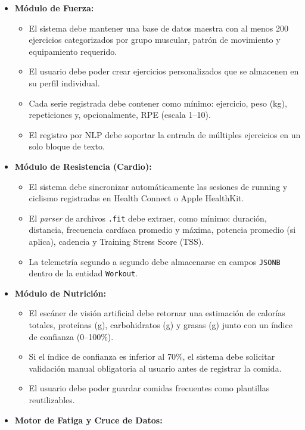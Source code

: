 \documentclass[12pt]{article}
\begin{document}
\begin{itemize}
    \item \textbf{Módulo de Fuerza:}
    \begin{itemize}
        \item El sistema debe mantener una base de datos maestra con al menos 200 ejercicios categorizados por grupo muscular, patrón de movimiento y equipamiento requerido.
        \item El usuario debe poder crear ejercicios personalizados que se almacenen en su perfil individual.
        \item Cada serie registrada debe contener como mínimo: ejercicio, peso (kg), repeticiones y, opcionalmente, RPE (escala 1--10).
        \item El registro por NLP debe soportar la entrada de múltiples ejercicios en un solo bloque de texto.
    \end{itemize}
    \item \textbf{Módulo de Resistencia (Cardio):}
    \begin{itemize}
        \item El sistema debe sincronizar automáticamente las sesiones de running y ciclismo registradas en Health Connect o Apple HealthKit.
        \item El \textit{parser} de archivos \texttt{.fit} debe extraer, como mínimo: duración, distancia, frecuencia cardíaca promedio y máxima, potencia promedio (si aplica), cadencia y Training Stress Score (TSS).
        \item La telemetría segundo a segundo debe almacenarse en campos \texttt{JSONB} dentro de la entidad \texttt{Workout}.
    \end{itemize}
    \item \textbf{Módulo de Nutrición:}
    \begin{itemize}
        \item El escáner de visión artificial debe retornar una estimación de calorías totales, proteínas (g), carbohidratos (g) y grasas (g) junto con un índice de confianza (0--100\%).
        \item Si el índice de confianza es inferior al 70\%, el sistema debe solicitar validación manual obligatoria al usuario antes de registrar la comida.
        \item El usuario debe poder guardar comidas frecuentes como plantillas reutilizables.
    \end{itemize}
    \item \textbf{Motor de Fatiga y Cruce de Datos:}

\end{itemize}
\end{document}
